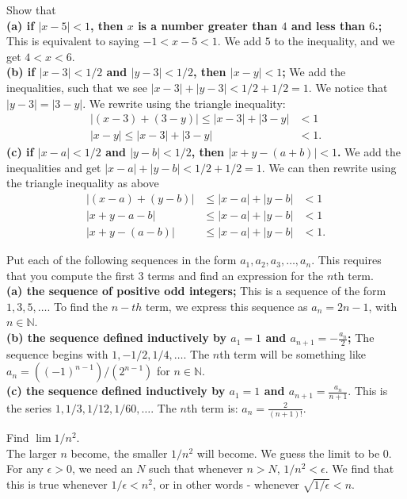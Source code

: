 \documentclass[12pt]{book}
\newcommand{\N}{\mathbb{N}}
\newenvironment{exercise}[2][Exercise]{\begin{trivlist}
\item[\hskip \labelsep {\bfseries #1}\hskip \labelsep {\bfseries #2.}]}{\end{trivlist}}
\begin{document}
\begin{exercise}{2.1.1}
Show that \\
\textbf{(a) if $|x - 5| < 1$, then $x$ is a number greater than $4$ and less than $6$.;} 
This is equivalent to saying $-1 < x - 5 < 1$. We add $5$ to the inequality, and we get $4 < x < 6$.\\
\textbf{(b) if $|x - 3| < 1/2$ and $|y - 3| < 1/2$, then $|x - y| < 1$;} We add the inequalities, such that we see $ |x-3| + |y - 3| < 1/2 + 1/2 = 1$. We notice that $|y-3| = |3-y|$. We rewrite using the triangle inequality:
	\begin{align*}
	|(x-3)+(3-y)| \leq |x-3| + |3-y| &< 1 \\
	|x - y| \leq |x-3| + |3-y| &< 1.
	\end{align*}
\textbf{(c) if $|x - a| < 1/2$ and $|y - b| < 1/2$, then $|x + y - (a + b)| < 1$.} We add the inequalities and get $|x-a| + |y-b| < 1/2 + 1/2 =1$. We can then rewrite using the triangle inequality as above
	\begin{align*}
		|(x-a) + (y-b) | &\leq |x-a| + |y-b| & < 1 \\
		|x+y - a-b| &\leq |x-a|+ |y-b| &<1\\
		|x+y - (a-b)|  &\leq |x-a|+ |y-b| &<1.
	\end{align*}
\end{exercise}

\begin{exercise}{2.1.3}
Put each of the following sequences in the form $a_1, a_2, a_3, \hdots, a_n$. This requires that you compute the first 3 terms and find an expression for the $n$th term. \\
\textbf{(a) the sequence of positive odd integers;} This is a sequence of the form $1,3,5,\hdots$. To find the $n-th$ term, we express this sequence as $a_n = 2 n - 1$, with $n \in \N$. \\
\textbf{(b) the sequence defined inductively by $a_1 = 1$ and $a_{n+1} = - \frac{a_n}{2}$;} The sequence begins with $1, -1/2, 1/4, \hdots$. The $n$th term will be something like $a_n= ((-1)^{n-1})/(2^{n-1})$ for $n \in \N$. \\
\textbf{(c) the sequence defined inductively by $a_1 = 1$ and $a_{n+1} = \frac{a_n}{n+1}$}. This is the series $1, 1/3, 1/12, 1/60, \hdots$. The $n$th term is: $a_n = \frac{2}{(n+1)!}$.
\end{exercise}

\begin{exercise}{2.1.4}
Find $\lim 1/n^2$. \\

The larger $n$ become, the smaller $1/n^2$ will become. We guess the limit to be $0$. For any $\epsilon > 0$, we need an $N$ such that whenever $n > N$, $1/n^2 < \epsilon$. We find that this is true whenever $ 1/\epsilon < n^2$, or in other words - whenever $\sqrt{1/ \epsilon} < n$.
\end{exercise}
\end{document}
